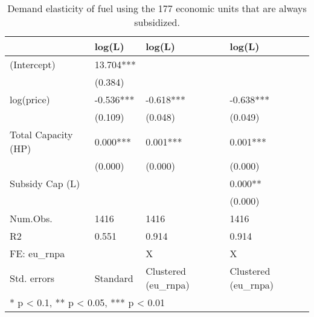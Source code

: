 \begin{table}

\caption{\label{tab:}Demand elasticity of fuel using the 177 economic units that are always subsidized.}
\centering
\begin{tabular}[t]{llll}
\toprule
  & log(L) & log(L)  & log(L)  \\
\midrule
(Intercept) & 13.704*** &  & \\
 & (0.384) &  & \\
log(price) & -0.536*** & -0.618*** & -0.638***\\
 & (0.109) & (0.048) & (0.049)\\
Total Capacity (HP) & 0.000*** & 0.001*** & 0.001***\\
 & (0.000) & (0.000) & (0.000)\\
Subsidy Cap (L) &  &  & 0.000**\\
 &  &  & (0.000)\\
\midrule
Num.Obs. & 1416 & 1416 & 1416\\
R2 & 0.551 & 0.914 & 0.914\\
FE: eu\_rnpa &  & X & X\\
Std. errors & Standard & Clustered (eu\_rnpa) & Clustered (eu\_rnpa)\\
\bottomrule
\multicolumn{4}{l}{\textsuperscript{} * p < 0.1, ** p < 0.05, *** p < 0.01}\\
\end{tabular}
\end{table}
